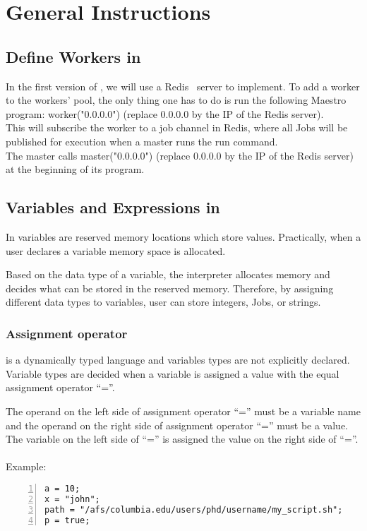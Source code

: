 \section{General Instructions}
\label{sect:general}

\subsection*{Define Workers in \lang{}}
In the first version of \lang{}, we will use a Redis~\cite{redis} server to
implement. To add a worker to the workers' pool, the only thing one has to do
is run the following Maestro program: worker("0.0.0.0") (replace 0.0.0.0 by
the IP of the Redis server).\\
This will subscribe the worker to a job channel in Redis, where all Jobs will
be published for execution when a master runs the run command.\\
The master calls master("0.0.0.0") (replace 0.0.0.0 by the IP of the Redis server)
at the beginning of its program.

\subsection*{Variables and Expressions in \lang{}}
In \lang{} variables are reserved memory locations which store values.
Practically, when a user declares a variable memory space is allocated.

Based on the data type of a variable, the interpreter allocates memory
and decides what can be stored in the reserved memory. Therefore, by
assigning different data types to variables, user can store integers, Jobs,
or strings.

\subsubsection*{Assignment operator}
\lang{}  is a dynamically typed language and variables types are not explicitly declared.
Variable types are decided when a variable is assigned a value with the equal
assignment operator ``=''.

The operand on the left side of assignment operator ``='' must be a variable name
and the operand on the right side of assignment operator ``='' must be a value.
The variable on the left side of ``='' is assigned the value on the right side
of ``=''.\\
\\
Example:
\begin{Verbatim}[numbers=left]
a = 10;
x = "john";
path = "/afs/columbia.edu/users/phd/username/my_script.sh";
p = true;
\end{Verbatim}

